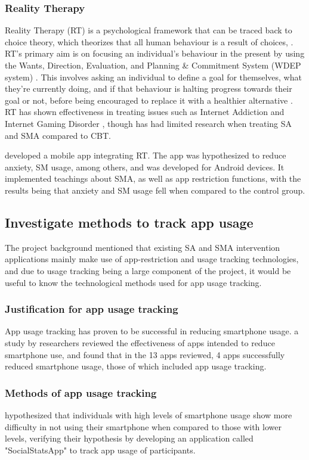 \documentclass[12pt]{article}
\begin{document}
\subsubsection{Reality Therapy}
Reality Therapy (RT) is a psychological framework that can be traced back to choice theory, which theorizes that 
all human behaviour is a result
of choices, . RT's primary aim is on
focusing an individual's behaviour in the present by using the Wants, Direction, Evaluation, and Planning \& 
Commitment System (WDEP system) . This involves asking an individual
to define a goal for themselves, what they're currently doing, and if that 
behaviour is halting progress towards their goal or not, before being encouraged to replace it with a
healthier alternative . RT has shown effectiveness in treating issues
such as Internet Addiction and Internet Gaming Disorder 
, though has had limited research
 when treating SA and SMA compared to CBT. \newline

 developed a mobile app 
integrating RT. The app was hypothesized to reduce anxiety, SM usage, among others, and was developed for Android 
devices. It implemented teachings about SMA, as well as app restriction functions, with the results being that 
anxiety and SM usage fell when compared to the control group.


\subsection{Investigate methods to track app usage}
The project background mentioned that existing SA and SMA intervention applications mainly make use of 
app-restriction and usage tracking technologies, and due to usage tracking being a large component of the project, 
it would be useful to know the technological methods used for app usage tracking.

\subsubsection{Justification for app usage tracking}
App usage tracking has proven to be successful in reducing smartphone usage. a
study by researchers reviewed the effectiveness of apps 
intended to reduce smartphone use, and found that in the 13 apps reviewed, 4 apps successfully reduced smartphone 
usage, those of which included app usage tracking.

\subsubsection{Methods of app usage tracking}
 hypothesized that individuals with high levels of 
smartphone usage show more difficulty in not using their smartphone when compared to those with lower levels, verifying their 
hypothesis by developing an application called "SocialStatsApp" to track app usage of participants.
\end{document}
